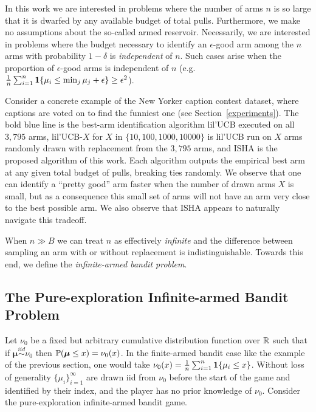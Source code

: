 In this work we are interested in problems where the number of arms $n$ is so large that it is dwarfed by any available budget of total pulls. Furthermore, we make no assumptions about the so-called armed reservoir.
Necessarily, we are interested in problems where the budget necessary to identify an $\epsilon$-good arm among the $n$ arms with probability $1-\delta$ is \emph{independent} of $n$. 
Such cases arise when the proportion of $\epsilon$-good arms is independent of $n$ (e.g. $\frac{1}{n} \sum_{i=1}^n \1\{ \mu_i \leq \min_j \mu_j + \epsilon\} \geq \epsilon^2$).

Consider a concrete example of the New Yorker caption contest dataset,
where captions are voted on to find the funniest one (see Section~\ref{experiments}).
The bold blue line is the best-arm identification algorithm lil'UCB \citep{Jamieson2014lilU} executed on all $3,795$ arms, lil'UCB-$X$ for $X$ in $\{10,100,1000,10000\}$ is lil'UCB run on $X$ arms randomly drawn with replacement from the $3,795$ arms, and ISHA is the proposed algorithm of this work. Each algorithm outputs the empirical best arm at any given total budget of pulls, breaking ties randomly.
We observe that one can identify a ``pretty good'' arm faster when the number of drawn arms $X$ is small, but as a consequence this small set of arms will not have an arm very close to the best possible arm.
We also observe that ISHA appears to naturally navigate this tradeoff.  

When $n \gg B$ we can treat $n$ as effectively \emph{infinite} and the difference between sampling an arm with or without replacement is indistinguishable. 
Towards this end, we define the \emph{infinite-armed bandit problem}.

\subsection{The Pure-exploration Infinite-armed Bandit Problem}
Let $\nu_0$ be a fixed but arbitrary cumulative distribution function over $\R$ such that if $\boldsymbol{\mu} \overset{iid}{\sim} \nu_0$ then $\P(\boldsymbol{\mu} \leq x) = \nu_0(x)$. 
In the finite-armed bandit case like the example of the previous section, one would take $\nu_0(x) = \frac{1}{n} \sum_{i=1}^n \1\{\mu_i \leq x \}$.
Without loss of generality $\{\mu_i\}_{i=1}^\infty$ are drawn iid from $\nu_0$ before the start of the game and identified by their index, and the player has no prior knowledge of $\nu_0$.
Consider the pure-exploration infinite-armed bandit game.

